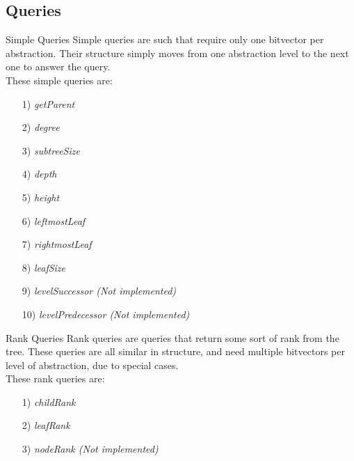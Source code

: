\documentclass{beamer}
\begin{document}
\subsection{Queries}

\begin{frame}{Simple Queries}
	Simple queries are such that require only one bitvector per abstraction. Their structure simply moves from one abstraction level to the next one to answer the query.\\
	These simple queries are:
	\begin{itemize}
	\item[1)] \textit{getParent}
	\item[2)] \textit{degree}
	\item[3)] \textit{subtreeSize}
	\item[4)] \textit{depth}
	\item[5)] \textit{height}
	\item[6)] \textit{leftmostLeaf}
	\item[7)] \textit{rightmostLeaf}
	\item[8)] \textit{leafSize}
	\item[9)] \textit{levelSuccessor (Not implemented)}
	\item[10)] \textit{levelPredecessor (Not implemented)}
	\end{itemize}
\end{frame}

\begin{frame}{Rank Queries}
	Rank queries are queries that return some sort of rank from the tree. These queries are all similar in structure, and need multiple bitvectors per level of abstraction, due to special cases.\\
	These rank queries are:
	\begin{itemize}
	\item[1)] \textit{childRank}
	\item[2)] \textit{leafRank}
	\item[3)] \textit{nodeRank (Not implemented)}
	\end{itemize}
\end{frame}
\end{document}
